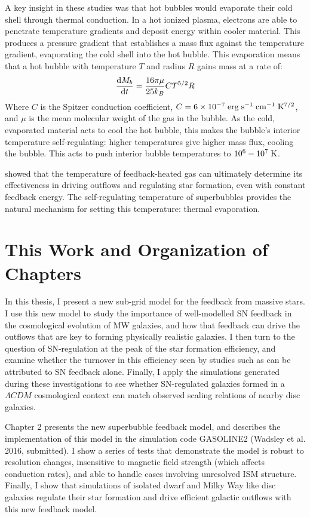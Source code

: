 A key insight in these studies was that hot bubbles would evaporate their cold
shell through thermal conduction.  In a hot ionized plasma, electrons are able
to penetrate temperature gradients and deposit energy within cooler material.
This produces a pressure gradient that establishes a mass flux against the
temperature gradient, evaporating the cold shell into the hot bubble.  This
evaporation means that a hot bubble with temperature $T$ and radius $R$ gains
mass at a rate of:
\begin{equation}
    \frac{{\rm d }M_b}{{\rm d}t} = \frac{16\pi\mu}{25k_B} CT^{5/2}R
\end{equation}
Where $C$ is the Spitzer conduction coefficient,
$C=6\times10^{-7}\;\rm{erg\;s^{-1}\;cm^{-1}\;K^{7/2}}$, and $\mu$ is the mean
molecular weight of the gas in the bubble.  As the cold, evaporated material
acts to cool the hot bubble, this makes the bubble's interior temperature
self-regulating: higher temperatures give higher mass flux, cooling the bubble.
This acts to push interior bubble temperatures to $10^6-10^7\;\rm{K}$.

\citet{DallaVecchia2012} showed that the temperature of feedback-heated gas can
ultimately determine its effectiveness in driving outflows and regulating star
formation, even with constant feedback energy.  The self-regulating temperature
of superbubbles provides the natural mechanism for setting this temperature:
thermal evaporation.

\section{This Work and Organization of Chapters}
In this thesis, I present a new sub-grid model for the feedback from massive
stars.  I use this new model to study the importance of well-modelled SN
feedback in the cosmological evolution of MW galaxies, and how that feedback can
drive the outflows that are key to forming physically realistic galaxies.  I
then turn to the question of SN-regulation at the peak of the star formation
efficiency, and examine whether the turnover in this efficiency seen by studies
such as \citet{Behroozi2013,Moster2013} can be attributed to SN feedback alone.
Finally, I apply the simulations generated during these investigations to
see whether SN-regulated galaxies formed in a $\Lambda CDM$ cosmological context
can match observed scaling relations of nearby disc galaxies.

Chapter 2 presents the new superbubble feedback model, and describes the
implementation of this model in the simulation code {\sc GASOLINE2} (Wadsley et
al. 2016, submitted).  I show a series of tests that demonstrate the model is
robust to resolution changes, insensitive to magnetic field strength (which
affects conduction rates), and able to handle cases involving unresolved ISM
structure.  Finally, I show that simulations of isolated dwarf and Milky Way
like disc galaxies regulate their star formation and drive efficient galactic
outflows with this new feedback model.

